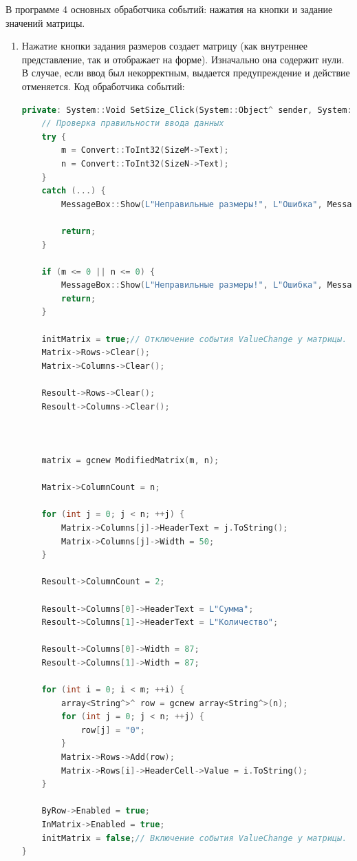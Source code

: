 \documentclass[a4paper,12pt]{article}
\theoremstyle{plain}
\theoremstyle{remark}
\theoremstyle{definition}
\begin{document}
	В программе 4 основных обработчика событий: нажатия на кнопки и задание значений матрицы.
	
	\begin{enumerate}
		\item Нажатие кнопки задания размеров создает матрицу (как внутреннее представление, так и отображает на форме). Изначально она содержит нули. В случае, если ввод был некорректным, выдается предупреждение и действие отменяется. Код обработчика событий:
		
		\begin{lstlisting}[language=C++]
private: System::Void SetSize_Click(System::Object^ sender, System::EventArgs^ e) {
	// Проверка правильности ввода данных
	try {
		m = Convert::ToInt32(SizeM->Text);
		n = Convert::ToInt32(SizeN->Text);
	}
	catch (...) {
		MessageBox::Show(L"Неправильные размеры!", L"Ошибка", MessageBoxButtons::OK, MessageBoxIcon::Error);
		
		return;
	}
	
	if (m <= 0 || n <= 0) {
		MessageBox::Show(L"Неправильные размеры!", L"Ошибка", MessageBoxButtons::OK, MessageBoxIcon::Error);
		return;
	}
	
	initMatrix = true;// Отключение события ValueChange у матрицы.
	Matrix->Rows->Clear();
	Matrix->Columns->Clear();
	
	Resoult->Rows->Clear();
	Resoult->Columns->Clear();
	
	
	
	matrix = gcnew ModifiedMatrix(m, n);
	
	Matrix->ColumnCount = n;
	
	for (int j = 0; j < n; ++j) {
		Matrix->Columns[j]->HeaderText = j.ToString();
		Matrix->Columns[j]->Width = 50;
	}
	
	Resoult->ColumnCount = 2;
	
	Resoult->Columns[0]->HeaderText = L"Сумма";
	Resoult->Columns[1]->HeaderText = L"Количество";
	
	Resoult->Columns[0]->Width = 87;
	Resoult->Columns[1]->Width = 87;
	
	for (int i = 0; i < m; ++i) {
		array<String^>^ row = gcnew array<String^>(n);
		for (int j = 0; j < n; ++j) {
			row[j] = "0";
		}
		Matrix->Rows->Add(row);
		Matrix->Rows[i]->HeaderCell->Value = i.ToString();
	}
	
	ByRow->Enabled = true;
	InMatrix->Enabled = true;
	initMatrix = false;// Включение события ValueChange у матрицы.
}
		\end{lstlisting}
		

\end{enumerate}
\end{document}
